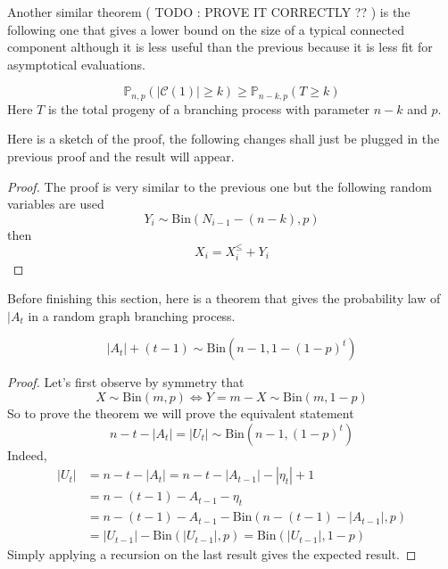 Another similar theorem ( TODO : PROVE IT CORRECTLY  ?? ) is the following one that gives a lower bound on the size of a typical connected component although it is less useful than the previous because it is less fit for asymptotical evaluations.

\begin{theorem}\label{th:lowbin}
	\begin{equation}
		\mathbb{P}_{n,p}(|\mathcal{C}(1)| \geq k) \geq \mathbb{P}_{n-k,p}(T\geq k)
	\end{equation}
	Here $T$ is the total progeny of a branching process with parameter $n-k$ and $p$.
\end{theorem}
Here is a sketch of the proof, the following changes shall just be plugged in the previous proof and the result will appear.
\begin{proof}
	The proof is very similar to the previous one but the following random variables are used
	\begin{equation}
		Y_i \sim \text{Bin}(N_{i-1} - (n-k), p)
	\end{equation}
	then 
	\begin{equation}
		X_i = X_i^{\leq}+Y_i
	\end{equation}
\end{proof}
Before finishing this section, here is a theorem that gives the probability law of $|A_t$ in a random graph branching process.
\begin{theorem}\label{th:Atlaw}
	\begin{equation}
		|A_t| + (t-1) \sim \text{Bin}(n-1, 1 - (1-p)^t)
	\end{equation}
\end{theorem}
\begin{proof}
	Let's first observe by symmetry that 
	\begin{equation}
		X \sim \text{Bin}(m, p) \iff Y = m-X \sim \text{Bin}(m, 1-p)
	\end{equation}
	So to prove the theorem we will prove the equivalent statement
	\begin{equation}
		n-t-|A_t| = |U_t| \sim \text{Bin}(n-1, (1-p)^t)
	\end{equation}
	Indeed, 
	\begin{align}
		|U_t| &= n - t - |A_t| = n - t - |A_{t-1}| - |\eta_t| + 1 \\
		      &= n - (t-1) - A_{t-1} -\eta_t \\
		      &= n - (t-1) - A_{t-1} - \text{Bin}(n-(t-1)-|A_{t-1}|, p)\\
		      &=|U_{t-1}| - \text{Bin}(|U_{t-1}|, p) = \text{Bin}(|U_{t-1}|, 1-p)
	\end{align}
	Simply applying a recursion on the last result gives the expected result.
\end{proof}
